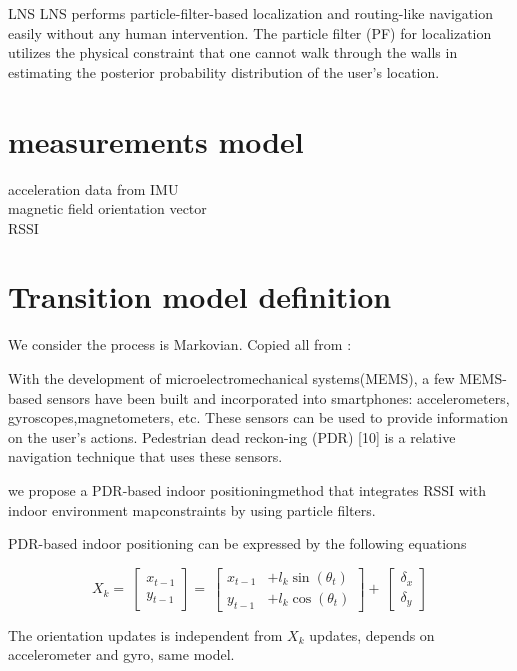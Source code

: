 \documentclass[a4paper, 12pt]{article}
\begin{document}
LNS
LNS performs particle-filter-based localization and routing-like navigation easily without any human intervention. The particle filter (PF) for localization utilizes the physical constraint that one cannot walk through the walls in estimating the posterior probability distribution of the user’s location.

\section{measurements model}

acceleration data from IMU \\
magnetic field orientation vector \\
RSSI


\section{Transition model definition}

We consider the process is Markovian.
Copied all from \cite{articleXia}:

With  the  development  of  microelectromechanical  systems(MEMS),  a  few  MEMS-based  sensors  have  been  built  and incorporated  into  smartphones:  accelerometers,  gyroscopes,magnetometers,  etc.  These  sensors  can  be  used  to  provide information  on  the  user’s  actions.  Pedestrian  dead  reckon-ing  (PDR)  [10]  is  a  relative  navigation  technique  that  uses these sensors.

we propose a PDR-based  indoor positioningmethod  that  integrates  RSSI  with  indoor  environment  mapconstraints by using particle filters.

PDR-based indoor positioning can be expressed by the following equations

\begin{equation}
X_k = \
\begin{bmatrix} 
x_{t-1} \\
y_{t-1} 
\end{bmatrix} = \
\begin{bmatrix} 
x_{t-1} &+ l_k \sin(\theta_t) \\
y_{t-1} &+ l_k \cos(\theta_t) 
\end{bmatrix} + \
\begin{bmatrix} 
\delta_{x} \\
\delta_{y} 
\end{bmatrix}
\end{equation}

The orientation  updates is independent from $X_k$ updates, depends on accelerometer and gyro, same model.
\end{document}
